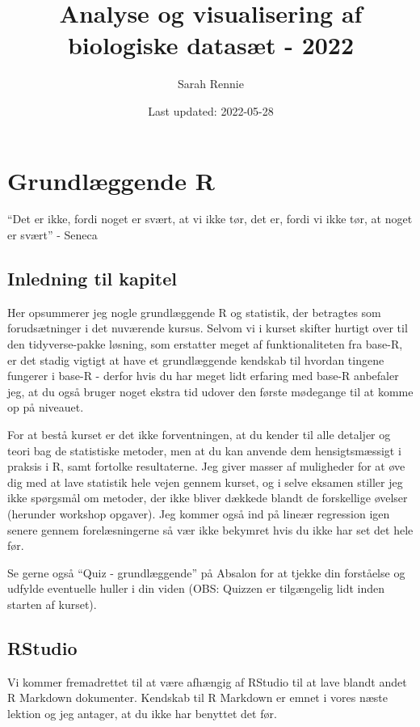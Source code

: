 \documentclass[
]{book}
\title{Analyse og visualisering af biologiske datasæt - 2022}
\author{Sarah Rennie}
\date{Last updated: 2022-05-28}
\begin{document}
\maketitle

{
\setcounter{tocdepth}{1}
\tableofcontents
}
\hypertarget{baser}{%
\chapter{Grundlæggende R}\label{baser}}

``Det er ikke, fordi noget er svært, at vi ikke tør, det er, fordi vi ikke tør, at noget er svært'' - Seneca

\hypertarget{inledning-til-kapitel}{%
\section{Inledning til kapitel}\label{inledning-til-kapitel}}

Her opsummerer jeg nogle grundlæggende R og statistik, der betragtes som forudsætninger i det nuværende kursus. Selvom vi i kurset skifter hurtigt over til den tidyverse-pakke løsning, som erstatter meget af funktionaliteten fra base-R, er det stadig vigtigt at have et grundlæggende kendskab til hvordan tingene fungerer i base-R - derfor hvis du har meget lidt erfaring med base-R anbefaler jeg, at du også bruger noget ekstra tid udover den første mødegange til at komme op på niveauet.

For at bestå kurset er det ikke forventningen, at du kender til alle detaljer og teori bag de statistiske metoder, men at du kan anvende dem hensigtsmæssigt i praksis i R, samt fortolke resultaterne. Jeg giver masser af muligheder for at øve dig med at lave statistik hele vejen gennem kurset, og i selve eksamen stiller jeg ikke spørgsmål om metoder, der ikke bliver dækkede blandt de forskellige øvelser (herunder workshop opgaver). Jeg kommer også ind på lineær regression igen senere gennem forelæsningerne så vær ikke bekymret hvis du ikke har set det hele før.

Se gerne også ``Quiz - grundlæggende'' på Absalon for at tjekke din forståelse og udfylde eventuelle huller i din viden (OBS: Quizzen er tilgængelig lidt inden starten af kurset).

\hypertarget{rstudio}{%
\section{RStudio}\label{rstudio}}

Vi kommer fremadrettet til at være afhængig af RStudio til at lave blandt andet R Markdown dokumenter. Kendskab til R Markdown er emnet i vores næste lektion og jeg antager, at du ikke har benyttet det før.
\end{document}
